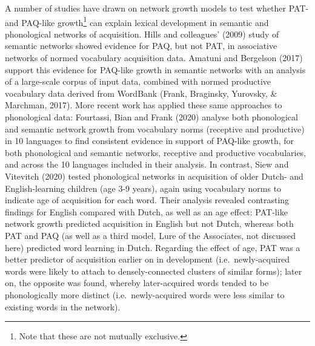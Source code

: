 \documentclass[
  english,
  man,floatsintext]{apa6}
\begin{document}
A number of studies have drawn on network growth models to test whether PAT- and PAQ-like growth\footnote{Note that these are not mutually exclusive.} can explain lexical development in semantic and phonological networks of acquisition. Hills and colleagues' (2009) study of semantic networks showed evidence for PAQ, but not PAT, in associative networks of normed vocabulary acquisition data. Amatuni and Bergelson (2017) support this evidence for PAQ-like growth in semantic networks with an analysis of a large-scale corpus of input data, combined with normed productive vocabulary data derived from WordBank (Frank, Braginsky, Yurovsky, \& Marchman, 2017). More recent work has applied these same approaches to phonological data: Fourtassi, Bian and Frank (2020) analyse both phonological and semantic network growth from vocabulary norms (receptive and productive) in 10 languages to find consistent evidence in support of PAQ-like growth, for both phonological and semantic networks, receptive and productive vocabularies, and across the 10 languages included in their analysis. In contrast, Siew and Vitevitch (2020) tested phonological networks in acquisition of older Dutch- and English-learning children (age 3-9 years), again using vocabulary norms to indicate age of acquisition for each word. Their analysis revealed contrasting findings for English compared with Dutch, as well as an age effect: PAT-like network growth predicted acquisition in English but not Dutch, whereas both PAT and PAQ (as well as a third model, Lure of the Associates, not discussed here) predicted word learning in Dutch. Regarding the effect of age, PAT was a better predictor of acquisition earlier on in development (i.e.~newly-acquired words were likely to attach to densely-connected clusters of similar forms); later on, the opposite was found, whereby later-acquired words tended to be phonologically more distinct (i.e.~newly-acquired words were less similar to existing words in the network).
\end{document}
